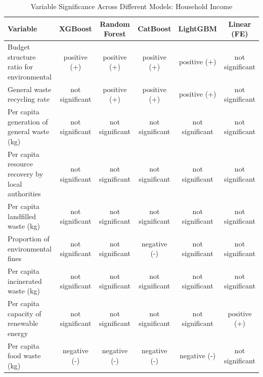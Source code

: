 \documentclass{article}
\begin{document}
\begin{table}[H]
\caption{Variable Significance Across Different Models: Household Income}
\label{tab:model_comparison}
\tiny
\begin{tabular}{lccccc}
\toprule
\textbf{Variable} & \textbf{XGBoost} & \textbf{Random Forest} & \textbf{CatBoost} & \textbf{LightGBM} & \textbf{Linear (FE)} \\
\midrule
Budget structure ratio for environmental & positive (+) & positive (+) & positive (+) & positive (+) & not significant \\
General waste recycling rate & not significant & positive (+) & positive (+) & positive (+) & not significant \\
Per capita generation of general waste (kg) & not significant & not significant & not significant & not significant & not significant \\
Per capita resource recovery by local authorities & not significant & not significant & not significant & not significant & not significant \\
Per capita landfilled waste (kg) & not significant & not significant & not significant & not significant & not significant \\
Proportion of environmental fines & not significant & not significant & negative (-) & not significant & not significant \\
Per capita incinerated waste (kg) & not significant & not significant & not significant & not significant & not significant \\
Per capita capacity of renewable energy & not significant & not significant & not significant & not significant & positive (+) \\
Per capita food waste (kg) & negative (-) & negative (-) & negative (-) & negative (-) & not significant \\
\bottomrule
\end{tabular}
\end{table}
\end{document}
